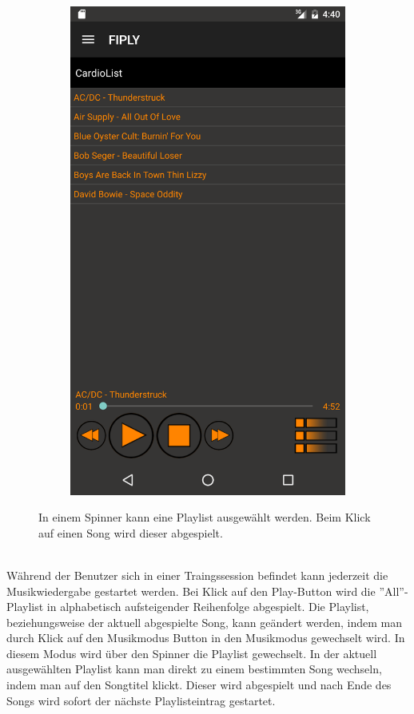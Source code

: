 \documentclass[FIPLY_base.tex]{subfiles}
\begin{document}
\begin{figure}[H]
\begin{subfigure}[b]{0.3\textwidth}
	\includegraphics[scale=0.17]{img/musicListenView2}
	\end{subfigure}
	\caption{In einem Spinner kann eine Playlist ausgewählt werden. Beim Klick auf einen Song wird dieser abgespielt.}
\end{figure}

\ \\
Während der Benutzer sich in einer Traingssession befindet kann jederzeit die Musikwiedergabe gestartet werden.
Bei Klick auf den Play-Button wird die ''All''-Playlist in alphabetisch aufsteigender Reihenfolge abgespielt. \newline
Die Playlist, beziehungsweise der aktuell abgespielte Song, kann geändert werden, indem man durch Klick auf den Musikmodus Button in den Musikmodus gewechselt wird. \newline
In diesem Modus wird über den Spinner die Playlist gewechselt. \newline
In der aktuell ausgewählten Playlist kann man direkt zu einem bestimmten Song wechseln, indem man auf den Songtitel klickt. 
Dieser wird abgespielt und nach Ende des Songs wird sofort der nächste Playlisteintrag gestartet.
\end{document}
